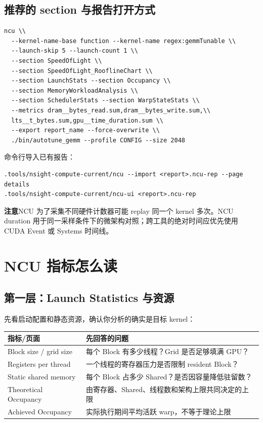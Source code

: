 \documentclass[UTF8,11pt,a4paper,fontset=fandol]{ctexart}
\newcommand{\caution}[1]{\par\noindent\colorbox{PaleOrange}{\parbox{\dimexpr\linewidth-2\fboxsep\relax}{\textbf{注意}\quad #1}}\par}
\newcommand{\pagebreakhere}{\clearpage}
\begin{document}
\subsection{推荐的 section 与报告打开方式}
\begin{lstlisting}[style=shell]
ncu \\
  --kernel-name-base function --kernel-name regex:gemmTunable \\
  --launch-skip 5 --launch-count 1 \\
  --section SpeedOfLight \\
  --section SpeedOfLight_RooflineChart \\
  --section LaunchStats --section Occupancy \\
  --section MemoryWorkloadAnalysis \\
  --section SchedulerStats --section WarpStateStats \\
  --metrics dram__bytes_read.sum,dram__bytes_write.sum,\\
  lts__t_bytes.sum,gpu__time_duration.sum \\
  --export report_name --force-overwrite \\
  ./bin/autotune_gemm --profile CONFIG --size 2048
\end{lstlisting}
命令行导入已有报告：
\begin{lstlisting}[style=shell]
.tools/nsight-compute-current/ncu --import <report>.ncu-rep --page details
.tools/nsight-compute-current/ncu-ui <report>.ncu-rep
\end{lstlisting}

\caution{NCU 为了采集不同硬件计数器可能 replay 同一个 kernel 多次。NCU duration 用于同一采样条件下的微架构对照；跨工具的绝对时间应优先使用 CUDA Event 或 Systems 时间线。}

\pagebreakhere
\section{NCU 指标怎么读}
\subsection{第一层：Launch Statistics 与资源}
先看启动配置和静态资源，确认你分析的确实是目标 kernel：
\begin{table}[H]\centering\small
\begin{tabularx}{\linewidth}{lX}
\toprule
指标/页面 & 先回答的问题\\\midrule
Block size / grid size & 每个 Block 有多少线程？Grid 是否足够填满 GPU？\\
Registers per thread & 一个线程的寄存器压力是否限制 resident Block？\\
Static shared memory & 每个 Block 占多少 Shared？是否因容量降低驻留数？\\
Theoretical Occupancy & 由寄存器、Shared、线程数和架构上限共同决定的上限\\
Achieved Occupancy & 实际执行期间平均活跃 warp，不等于理论上限\\
\bottomrule
\end{tabularx}
\end{table}
\end{document}
